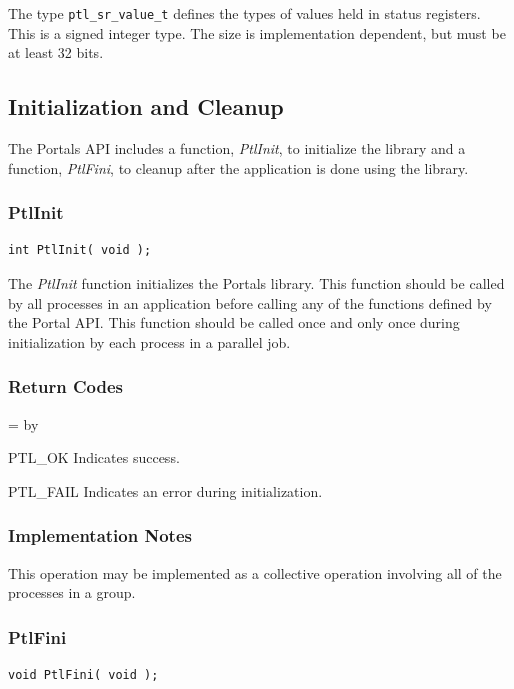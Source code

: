 \documentclass{sand-report}
\newcommand{\retlabel}[1]{\mbox{\texttt{#1}}\hfil}
\newenvironment{returns}%
  {\begin{list}{}%
      {\renewcommand{\makelabel}{\retlabel}%
        \topsep=0.0pt%
        \labelwidth=1.25in%
        \leftmargin=\labelwidth%
        \advance \leftmargin by \labelsep%
        \setlength{\itemsep}{.5\smallskipamount}%
        \setlength{\parsep}{0pt}}%
      }%
  {\end{list}}
\begin{document}
The type \texttt{ptl_sr_value_t} defines the types of values held in
status registers.  This is a signed integer type.  The size is
implementation dependent, but must be at least 32 bits.

\subsection{Initialization and Cleanup}\label{sec:init}

The Portals API includes a function, \emph{PtlInit}, to initialize the
library and a function, \emph{PtlFini}, to cleanup after the
application is done using the library.

\subsubsection{PtlInit}
\begin{verbatim}
int PtlInit( void );
\end{verbatim}

\noindent
The \emph{PtlInit} function initializes the Portals library.  This
function should be called by all processes in an application before
calling any of the functions defined by the Portal API.  This function
should be called once and only once during initialization by each
process in a parallel job.

\subsubsection*{Return Codes}
\begin{returns}
\item[PTL_OK] Indicates success.
\item[PTL_FAIL] Indicates an error during initialization.
\end{returns}

\subsubsection*{Implementation Notes}
This operation may be implemented as a collective operation involving
all of the processes in a group.

\subsubsection{PtlFini}
\begin{verbatim}
void PtlFini( void );
\end{verbatim}
\end{document}
